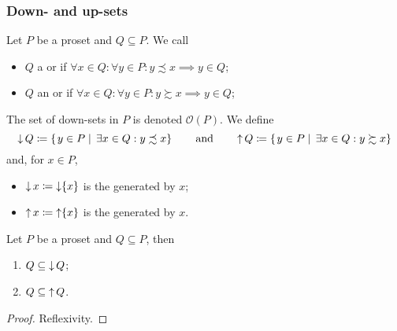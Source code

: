 \subsubsection{Down- and up-sets}
\begin{definition}
Let $P$ be a proset and $Q\subseteq P$. We call
\begin{itemize}
\item $Q$ a  or  if $\forall x\in Q: \forall y\in P: y\precsim x \implies y\in Q$;
\item $Q$ an  or  if $\forall x\in Q: \forall y\in P: y\succsim x \implies y\in Q$;
\end{itemize}
The set of down-sets in $P$ is denoted $\mathcal{O}(P)$. We define
\[ \mathop{\downarrow} Q \coloneqq \left\{\left. y\in P \;\right|\; \exists x\in Q: y\precsim x \right\} \qquad \text{and} \qquad \mathop{\uparrow} Q \coloneqq \left\{\left. y\in P \;\right|\; \exists x\in Q: y\succsim x \right\} \]
and, for $x\in P$,
\begin{itemize}
\item $\mathop{\downarrow} x \coloneqq \mathop{\downarrow}\{x\}$ is the  generated by $x$;
\item $\mathop{\uparrow} x \coloneqq \mathop{\uparrow}\{x\}$ is the  generated by $x$.
\end{itemize}
\end{definition}

\begin{lemma} \label{lemma:QsubseteDownQ}
Let $P$ be a proset and $Q\subseteq P$, then
\begin{enumerate}
\item $Q \subseteq \mathop{\downarrow} Q$;
\item $Q \subseteq \mathop{\uparrow} Q$.
\end{enumerate}
\end{lemma}
\begin{proof}
Reflexivity.
\end{proof}

